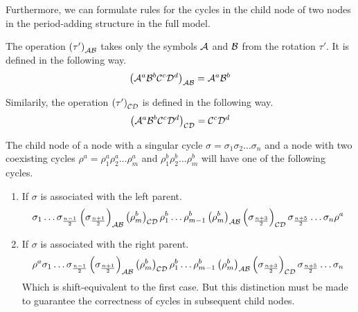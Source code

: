 
Furthermore, we can formulate rules for the cycles in the child node of two nodes in the period-adding structure in the full model.

\begin{definition}
    The operation $\left(\tau'\right)_{\mathcal{A}\mathcal{B}}$ takes only the symbols $\mathcal{A}$ and $\mathcal{B}$ from the rotation $\tau'$.
    It is defined in the following way.
    \begin{align}
        \left(\mathcal{A}^a\mathcal{B}^b\mathcal{C}^c\mathcal{D}^d\right)_{\mathcal{A}\mathcal{B}} = \mathcal{A}^a\mathcal{B}^b
    \end{align}

    Similarily, the operation $\left(\tau'\right)_{\mathcal{C}\mathcal{D}}$ is defined in the following way.
    \begin{align}
        \left(\mathcal{A}^a\mathcal{B}^b\mathcal{C}^c\mathcal{D}^d\right)_{\mathcal{C}\mathcal{D}} = \mathcal{C}^c\mathcal{D}^d
    \end{align}
\end{definition}

\begin{theorem}
    The child node of a node with a singular cycle $\sigma = \sigma_1\sigma_2 \dots \sigma_n$ and a node with two coexisting cycles $\rho^a = \rho^a_1\rho^a_2 \dots \rho^a_m$ and $\rho^b_1\rho^b_2 \dots \rho^b_m$ will have one of the following cycles.
    \begin{enumerate}
        \item If $\sigma$ is associated with the left parent.
              \begin{align*}
                  \sigma_1 \dots \sigma_{\frac{n-1}{2}} \left(\sigma_{\frac{n+1}{2}}\right)_{\mathcal{A}\mathcal{B}}
                  \left(\rho^b_m\right)_{\mathcal{C}\mathcal{D}} \rho^b_1 \dots \rho^b_{m-1} \left(\rho^b_m\right)_{\mathcal{A}\mathcal{B}}
                  \left(\sigma_{\frac{n+3}{2}}\right)_{\mathcal{C}\mathcal{D}} \sigma_{\frac{n+5}{2}} \dots \sigma_n
                  \rho^a
              \end{align*}
        \item If $\sigma$ is associated with the right parent.
              \begin{align*}
                  \rho^a
                  \sigma_1 \dots \sigma_{\frac{n-1}{2}} \left(\sigma_{\frac{n+1}{2}}\right)_{\mathcal{A}\mathcal{B}}
                  \left(\rho^b_m\right)_{\mathcal{C}\mathcal{D}} \rho^b_1 \dots \rho^b_{m-1} \left(\rho^b_m\right)_{\mathcal{A}\mathcal{B}}
                  \left(\sigma_{\frac{n+3}{2}}\right)_{\mathcal{C}\mathcal{D}} \sigma_{\frac{n+5}{2}} \dots \sigma_n
              \end{align*}
              Which is shift-equivalent to the first case.
              But this distinction must be made to guarantee the correctness of cycles in subsequent child nodes.
    \end{enumerate}
\end{theorem}

